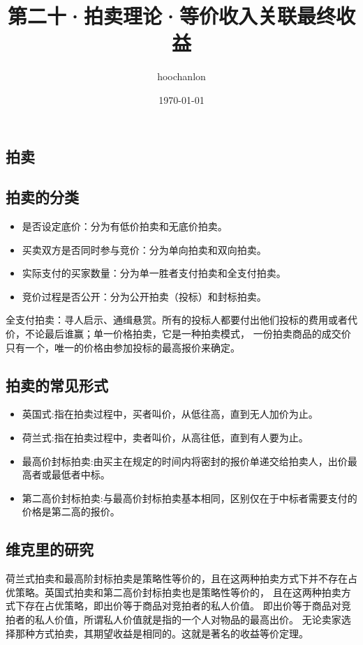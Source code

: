 \documentclass[12pt, a4paper]{article} %
\title{第二十·拍卖理论·等价收入关联最终收益}
\author{hoochanlon}
\date{\today}
\begin{document}
	\begin{CJK*}{UTF8}{gbsn}
		\maketitle
        \clearpage
        \section{拍卖}
        \subsection{拍卖的分类}
        \begin{itemize}
            \item 是否设定底价：分为有低价拍卖和无底价拍卖。
            \item 买卖双方是否同时参与竞价：分为单向拍卖和双向拍卖。
            \item 实际支付的买家数量：分为单一胜者支付拍卖和全支付拍卖。
            \item 竞价过程是否公开：分为公开拍卖（投标）和封标拍卖。
        \end{itemize}
        全支付拍卖：寻人启示、通缉悬赏。所有的投标人都要付出他们投标的费用或者代价，不论最后谁赢；单一价格拍卖，它是一种拍卖模式，
        一份拍卖商品的成交价只有一个，唯一的价格由参加投标的最高报价来确定。

        \subsection{拍卖的常见形式}
        \begin{itemize}
            \item 英国式:指在拍卖过程中，买者叫价，从低往高，直到无人加价为止。
            \item 荷兰式:指在拍卖过程中，卖者叫价，从高往低，直到有人要为止。
            \item 最高价封标拍卖:由买主在规定的时间内将密封的报价单递交给拍卖人，出价最高者或最低者中标。
            \item 第二高价封标拍卖:与最高价封标拍卖基本相同，区别仅在于中标者需要支付的价格是第二高的报价。
        \end{itemize}

        \subsection{维克里的研究}
        荷兰式拍卖和最高阶封标拍卖是策略性等价的，且在这两种拍卖方式下并不存在占优策略。英国式拍卖和第二高价封标拍卖也是策略性等价的，
        且在这两种拍卖方式下存在占优策略，即出价等于商品对竞拍者的私人价值。 即出价等于商品对竞拍者的私人价值，所谓私人价值就是指的一个人对物品的最高出价。
        无论卖家选择那种方式拍卖，其期望收益是相同的。这就是著名的收益等价定理。\par


\end{CJK*}
\end{document}
